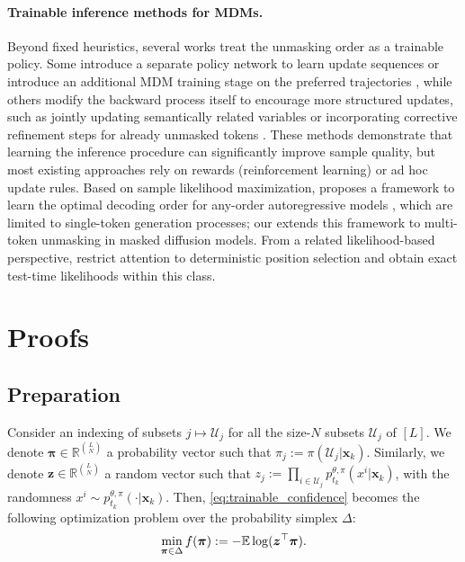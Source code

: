 \paragraph{Trainable inference methods for MDMs.}
Beyond fixed heuristics, several works treat the unmasking order as a trainable policy. Some introduce a separate policy network to learn update sequences \citep{peng2025path, jazbec2025learning, chen2025dultra} or introduce an additional MDM training stage on the preferred trajectories \citep{song2025seeddiffusionlargescalediffusion}, while others modify the backward process itself to encourage more structured updates, such as jointly updating semantically related variables \citep{meshchaninov2025guided} or incorporating corrective refinement steps for already unmasked tokens \citep{zhao2024informed}. These methods demonstrate that learning the inference procedure can significantly improve sample quality, but most existing approaches rely on rewards (reinforcement learning) or ad hoc update rules. Based on sample likelihood maximization, \citet{wang2025learningorder} proposes a framework to learn the optimal decoding order for any-order autoregressive models \citep{shih2022traininginferenceanyorderautoregressive}, which are limited to single-token generation processes; our \alg{} extends this framework to multi-token unmasking in masked diffusion models. From a related likelihood-based perspective, \citet{turok2026duel} restrict attention to deterministic position selection and obtain exact test-time likelihoods within this class. 

\section{Proofs}
\subsection{Preparation}
Consider an indexing of subsets $j\mapsto\mathcal U_j$ for all the size-$N$ subsets $\mathcal U_j$ of $[L]$. We denote $\bm\pi\in\mathbb R^{\binom{L}{N}}$ a probability vector such that $\pi_j:=\pi(\mathcal U_j|\bm x_k)$. Similarly, we denote $\bm z\in\mathbb R^{\binom{L}{N}}$ a random vector such that $z_j:=\prod_{i\in\mathcal U_j}p_{t_k}^{\theta,\pi}(x^i|\bm x_k)$, with the randomness $x^i\sim p_{t_k}^{\theta,\pi}(\cdot|\bm x_k)$. Then, \eqref{eq:trainable_confidence} becomes the following optimization problem over the probability simplex $\Delta$:
\begin{align}\label{eq:obj-equiv}
    \min_{\bm\pi\in\Delta}f(\bm\pi):=-\mathbb{E}\log(\bm z^\top\bm\pi).
\end{align}

